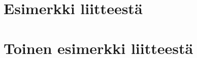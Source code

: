\documentclass[english, 12pt, a4paper, sci, utf8, a-1b, online]{aaltothesis}
\begin{document}










\clearpage
\thesisappendix

\section{Esimerkki liitteestä\label{LiiteA}}



\clearpage
\section{Toinen esimerkki liitteestä\label{LiiteB}}



\end{document}
